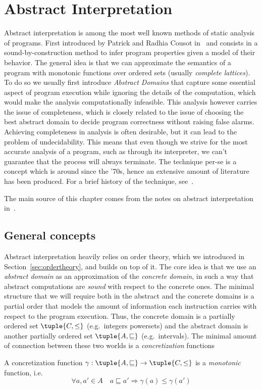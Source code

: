 \section{Abstract Interpretation}\label{sec:abstrint}

Abstract interpretation is among the most well known methods of static
analysis of programs. First introduced by Patrick and Radhia Cousot
in~\cite{patrickradhia:one, patrickradhia:two} and consists in a
sound-by-construction method to infer program properties given a model
of their behavior. The general idea is that we can approximate the
semantics of a program with monotonic functions over ordered sets
(usually \emph{complete lattices}). To do so we usually first
introduce \emph{Abstract Domains} that capture some essential aspect
of program execution while ignoring the details of the computation,
which would make the analysis computationally infeasible.  This
analysis however carries the issue of completeness, which is closely
related to the issue of choosing the best abstract domain to decide
program correctness without raising false alarms. Achieving
completeness in analysis is often desirable, but it can lead to the
problem of undecidability. This means that even though we strive for
the most accurate analysis of a program, such as through its
interpreter, we can't guarantee that the process will always
terminate.  The technique per-se is a concept which is around since
the '70s, hence an extensive amount of literature has been
produced. For a brief history of the technique,
see~\cite{ranzato:history}.

The main source of this chapter comes from the notes on abstract
interpretation in~\cite{mine:course}.

\subsection{General concepts}\label{subsec:abstrgeneral}

Abstract interpretation heavily relies on order theory, which we
introduced in Section~\ref{sec:ordertheory}, and builds on top of
it. The core idea is that we use an \emph{abstract domain} as an
approximation of the \emph{concrete domain}, in such a way that
abstract computations are \emph{sound} with respect to the concrete
ones. The minimal structure that we will require both in the abstract
and the concrete domains is a partial order that models the amount of
information each instruction carries with respect to the program
execution. Thus, the concrete domain is a partially ordered set
\(\tuple{C, \leq}\) (e.g.\ integers powersets) and the abstract domain
is another partially ordered set \(\tuple{A, \sqsubseteq}\) (e.g.\
intervals). The minimal amount of connection between these two worlds
is a \emph{concretization} functions
\begin{definition}[Concretization]
  A concretization function
  \(\gamma : \tuple{A , \sqsubseteq} \to \tuple{C, \leq}\) is a
  \emph{monotonic} function, i.e.
  \begin{equation*}
    \forall a,a' \in A \quad a \sqsubseteq a' \Rightarrow \gamma(a) \leq \gamma(a')
  \end{equation*}
\end{definition}

